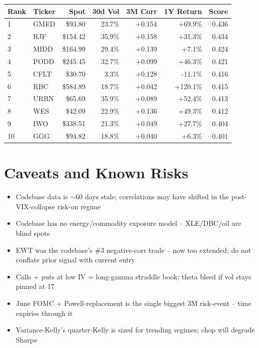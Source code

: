\documentclass[11pt,letterpaper]{article}
\begin{document}
\begin{longtable}{l l r r r r r}
\toprule
Rank & Ticker & Spot & 30d Vol & 3M Corr & 1Y Return & Score \\
\midrule
\endhead
1  & GMED  & \$93.80   & 23.7\% & +0.154 & \textcolor{gain}{+69.9\%}  & 0.436 \\
2  & RJF   & \$154.42  & 35.9\% & +0.158 & \textcolor{gain}{+31.3\%}  & 0.434 \\
3  & MIDD  & \$164.99  & 29.4\% & +0.139 & \textcolor{gain}{+7.1\%}   & 0.424 \\
4  & PODD  & \$245.45  & 32.7\% & +0.099 & \textcolor{gain}{+46.3\%}  & 0.421 \\
5  & CFLT  & \$30.70   & 3.3\%  & +0.128 & -11.1\%                  & 0.416 \\
6  & RBC   & \$584.89  & 18.7\% & +0.042 & \textcolor{gain}{+120.1\%} & 0.415 \\
7  & URBN  & \$65.69   & 35.9\% & +0.089 & \textcolor{gain}{+52.4\%}  & 0.413 \\
8  & WES   & \$42.09   & 22.9\% & +0.136 & \textcolor{gain}{+49.3\%}  & 0.412 \\
9  & IWO   & \$338.51  & 21.3\% & +0.049 & \textcolor{gain}{+27.7\%}  & 0.404 \\
10 & GGG   & \$94.82   & 18.8\% & +0.040 & \textcolor{gain}{+6.3\%}   & 0.401 \\
\bottomrule
\end{longtable}

\section{Caveats and Known Risks}

\begin{itemize}[nosep]
  \item Codebase data is $\sim$60 days stale; correlations may have
        shifted in the post-VIX-collapse risk-on regime
  \item Codebase has no energy/commodity exposure model -- XLE/DBC/oil
        are blind spots
  \item EWT was the codebase's \#3 negative-corr trade -- now too
        extended; do not conflate prior signal with current entry
  \item Calls + puts at low IV = long-gamma straddle book; theta
        bleed if vol stays pinned at 17
  \item June FOMC + Powell-replacement is the single biggest 3M
        risk-event -- time expiries through it
  \item Variance-Kelly's quarter-Kelly is sized for trending regimes;
        chop will degrade Sharpe
\end{itemize}
\end{document}

